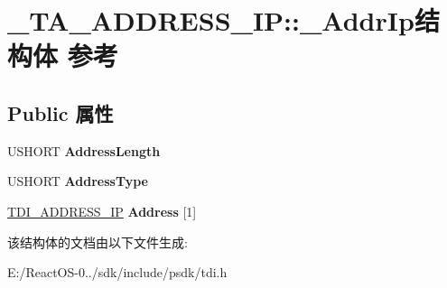 \hypertarget{struct___t_a___a_d_d_r_e_s_s___i_p_1_1___addr_ip}{}\section{\+\_\+\+T\+A\+\_\+\+A\+D\+D\+R\+E\+S\+S\+\_\+\+IP\+:\+:\+\_\+\+Addr\+Ip结构体 参考}
\label{struct___t_a___a_d_d_r_e_s_s___i_p_1_1___addr_ip}
\subsection*{Public 属性}
\begin{DoxyCompactItemize}
\item 
\mbox{\label{struct___t_a___a_d_d_r_e_s_s___i_p_1_1___addr_ip_a8be7b14c440496f376a7e46c0e0fef7f}} 
U\+S\+H\+O\+RT {\bfseries Address\+Length}
\item 
\mbox{\label{struct___t_a___a_d_d_r_e_s_s___i_p_1_1___addr_ip_acf9f4bfd772e78ac0a1a673d2331f148}} 
U\+S\+H\+O\+RT {\bfseries Address\+Type}
\item 
\mbox{\label{struct___t_a___a_d_d_r_e_s_s___i_p_1_1___addr_ip_a5cee947221bb774145f2b53a46fdf3d5}} 
\hyperlink{struct___t_d_i___a_d_d_r_e_s_s___i_p}{T\+D\+I\+\_\+\+A\+D\+D\+R\+E\+S\+S\+\_\+\+IP} {\bfseries Address} \mbox{[}1\mbox{]}
\end{DoxyCompactItemize}


该结构体的文档由以下文件生成\+:\begin{DoxyCompactItemize}
\item 
E\+:/\+React\+O\+S-\/0../sdk/include/psdk/tdi.\+h\end{DoxyCompactItemize}
